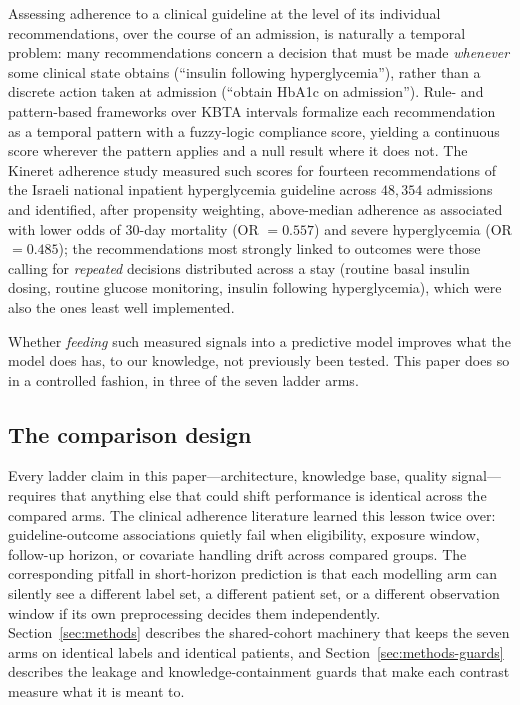 Assessing adherence to a clinical guideline at the level of its individual
recommendations, over the course of an admission, is naturally a temporal
problem: many recommendations concern a decision that must be made
\emph{whenever} some clinical state obtains (``insulin following
hyperglycemia''), rather than a discrete action taken at admission
(``obtain HbA1c on admission''). Rule- and pattern-based frameworks over
KBTA intervals \citep{oded2027kineret-jbi} formalize each recommendation
as a temporal pattern with a fuzzy-logic compliance score, yielding a
continuous score wherever the pattern applies and a null result where it
does not. The Kineret adherence study measured such scores for fourteen
recommendations of the Israeli national inpatient hyperglycemia guideline
\citep{hochberg2023inpatient} across $48{,}354$ admissions and identified,
after propensity weighting, above-median adherence as associated with
lower odds of $30$-day mortality (OR $=0.557$) and severe hyperglycemia
(OR $=0.485$); the recommendations most strongly linked to outcomes were
those calling for \emph{repeated} decisions distributed across a stay
(routine basal insulin dosing, routine glucose monitoring, insulin
following hyperglycemia), which were also the ones least well
implemented.

Whether \emph{feeding} such measured signals into a predictive model
improves what the model does has, to our knowledge, not previously been
tested. This paper does so in a controlled fashion, in three of the seven
ladder arms.

\subsection{The comparison design}

Every ladder claim in this paper---architecture, knowledge base, quality
signal---requires that anything else that could shift performance is
identical across the compared arms. The clinical adherence literature
learned this lesson twice over: guideline-outcome associations quietly
fail when eligibility, exposure window, follow-up horizon, or covariate
handling drift across compared groups. The corresponding pitfall in
short-horizon prediction is that each modelling arm can silently see a
different label set, a different patient set, or a different observation
window if its own preprocessing decides them independently. Section~\ref{sec:methods}
describes the shared-cohort machinery that keeps the seven arms on
identical labels and identical patients, and Section~\ref{sec:methods-guards}
describes the leakage and knowledge-containment guards that make each
contrast measure what it is meant to.
